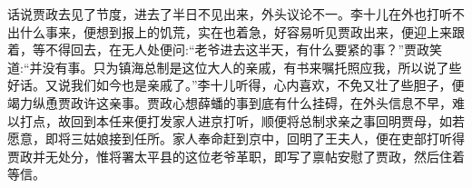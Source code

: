 


\begin{parag}
    话说贾政去见了节度，进去了半日不见出来，外头议论不一。李十儿在外也打听不出什么事来，便想到报上的饥荒，实在也着急，好容易听见贾政出来，便迎上来跟着，等不得回去，在无人处便问:“老爷进去这半天，有什么要紧的事？”贾政笑道:“并没有事。只为镇海总制是这位大人的亲戚，有书来嘱托照应我，所以说了些好话。又说我们如今也是亲戚了。”李十儿听得，心内喜欢，不免又壮了些胆子，便竭力纵恿贾政许这亲事。贾政心想薛蟠的事到底有什么挂碍，在外头信息不早，难以打点，故回到本任来便打发家人进京打听，顺便将总制求亲之事回明贾母，如若愿意，即将三姑娘接到任所。家人奉命赶到京中，回明了王夫人，便在吏部打听得贾政并无处分，惟将署太平县的这位老爷革职，即写了禀帖安慰了贾政，然后住着等信。
\end{parag}


